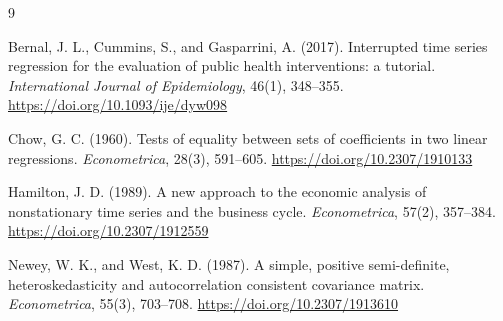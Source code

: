 \documentclass[11pt]{article}
\begin{document}
\begin{thebibliography}{9}

Bernal, J. L., Cummins, S., and Gasparrini, A. (2017).
\newblock Interrupted time series regression for the evaluation of public
health interventions: a tutorial.
\newblock \emph{International Journal of Epidemiology}, 46(1), 348--355.
\newblock \url{https://doi.org/10.1093/ije/dyw098}

Chow, G. C. (1960).
\newblock Tests of equality between sets of coefficients in two linear
regressions.
\newblock \emph{Econometrica}, 28(3), 591--605.
\newblock \url{https://doi.org/10.2307/1910133}

Hamilton, J. D. (1989).
\newblock A new approach to the economic analysis of nonstationary time series
and the business cycle.
\newblock \emph{Econometrica}, 57(2), 357--384.
\newblock \url{https://doi.org/10.2307/1912559}

Newey, W. K., and West, K. D. (1987).
\newblock A simple, positive semi-definite, heteroskedasticity and
autocorrelation consistent covariance matrix.
\newblock \emph{Econometrica}, 55(3), 703--708.
\newblock \url{https://doi.org/10.2307/1913610}

\end{thebibliography}
\end{document}
